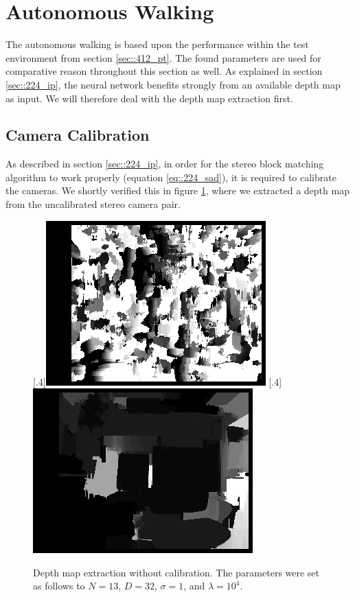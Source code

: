 \FloatBarrier
\section{Autonomous Walking}
\label{sec::42_aw}
The autonomous walking is based upon the performance within the test environment from section \ref{sec::412_pt}. The found parameters are used for comparative reason throughout this section as well. As explained in section \ref{sec::224_ip}, the neural network benefits strongly from an available depth map as input. We will therefore deal with the depth map extraction first.
\FloatBarrier
\subsection{Camera Calibration}
\label{sec::421_cc}
As described in section \ref{sec::224_ip}, in order for the stereo block matching algorithm to work properly (equation \ref{eq::224_sad}), it is required to calibrate the cameras. We shortly verified this in figure \ref{fig::421_no_calib}, where we extracted a depth map from the uncalibrated stereo camera pair.
\begin{figure}[h!]
	\centering
	[.4\linewidth]{\includegraphics[scale=.3]{chapters/04_experiments/02_autonomous_walking/02_depth_map_parameter_tuning/disp_no_calib.png}}
	[.4\linewidth]{\includegraphics[scale=.3]{chapters/04_experiments/02_autonomous_walking/02_depth_map_parameter_tuning/wls_no_calib.png}}
	\caption{Depth map extraction without calibration. The parameters were set as follows to $N=13$, $D=32$, $\sigma = 1$, and $\lambda=10^4$.}
	\label{fig::421_no_calib}
\end{figure}
